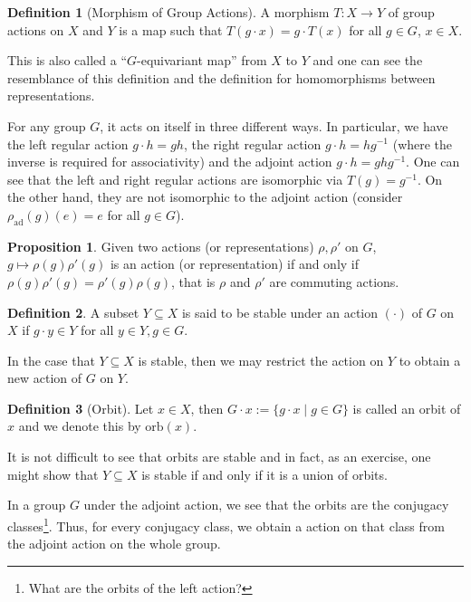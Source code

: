 \documentclass[]{article}
\theoremstyle{definition}
\theoremstyle{definition}
\newtheorem{definition}{Definition}[section]
\newtheorem{proposition}{Proposition}[section]
\begin{document}
\begin{definition}[Morphism of Group Actions]
  A morphism \(T : X \to Y\) of group actions on \(X\) and \(Y\) is a map 
  such that \(T(g \cdot x) = g \cdot T(x)\) for all \(g \in G\), \(x \in X\).

  This is also called a ``\(G\)-equivariant map'' from \(X\) to \(Y\) and 
  one can see the resemblance of this definition and the definition 
  for homomorphisms between representations.
\end{definition}

For any group \(G\), it acts on itself in three different ways. In particular, 
we have the left regular action \(g \cdot h = gh\), the right regular action 
\(g \cdot h = h g^{-1}\) (where the inverse is required for associativity) 
and the adjoint action \(g \cdot h = g h g^{-1}\). One can see that the left 
and right regular actions are isomorphic via \(T(g) = g^{-1}\). On the other 
hand, they are not isomorphic to the adjoint action (consider 
\(\rho_{\text{ad}}(g)(e) = e\) for all \(g \in G\)).

\begin{proposition}
  Given two actions (or representations) \(\rho, \rho'\) on \(G\), 
  \(g \mapsto \rho(g)\rho'(g)\) is an action (or representation) if and only if 
  \(\rho(g)\rho'(g) = \rho'(g)\rho(g)\), that is \(\rho\) and \(\rho'\) are 
  commuting actions.
\end{proposition}

\begin{definition}
  A subset \(Y \subseteq X\) is said to be stable under an action 
  \((\cdot)\) of \(G\) on \(X\) if \(g \cdot y \in Y\) for all 
  \(y \in Y, g \in G\).
\end{definition}

In the case that \(Y \subseteq X\) is stable, then we may restrict the action 
on \(Y\) to obtain a new action of \(G\) on \(Y\). 

\begin{definition}[Orbit]
  Let \(x \in X\), then \(G \cdot x := \{ g \cdot x \mid g \in G \}\) is called 
  an orbit of \(x\) and we denote this by \(\text{orb}(x)\). 
\end{definition}

It is not difficult to see that orbits are stable and in fact, as an exercise, 
one might show that \(Y \subseteq X\) is stable if and only if it is a union of 
orbits.

In a group \(G\) under the adjoint action, we see that the orbits are the 
conjugacy classes\footnote{What are the orbits of the left action?}. Thus, 
for every conjugacy class, we obtain a action on that class from the adjoint 
action on the whole group. 
\end{document}
